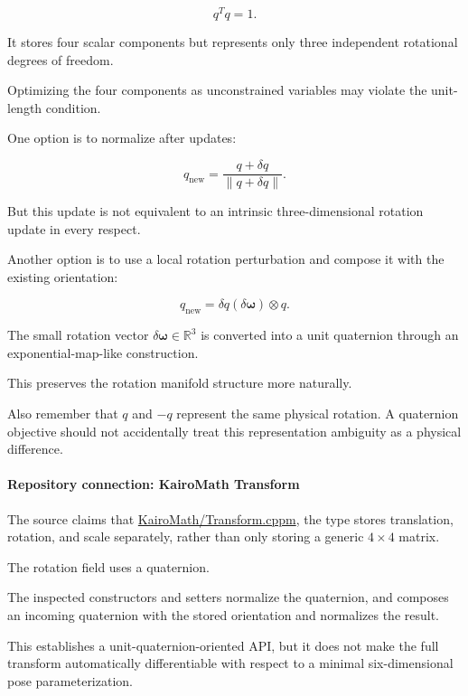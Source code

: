\[
q^Tq=1.
\]

It stores four scalar components but represents only three independent rotational degrees of freedom.

Optimizing the four components as unconstrained variables may violate the unit-length condition.

One option is to normalize after updates:

\[
q_{\mathrm{new}}= \frac{q+\delta q}{\|q+\delta q\|}.
\]

But this update is not equivalent to an intrinsic three-dimensional rotation update in every respect.

Another option is to use a local rotation perturbation and compose it with the existing orientation:

\[
q_{\mathrm{new}}= \delta q(\delta\boldsymbol\omega)\otimes q.
\]

The small rotation vector \(\delta\boldsymbol\omega\in\mathbb R^3\) is converted into a unit quaternion through an exponential-map-like construction.

This preserves the rotation manifold structure more naturally.

Also remember that \(q\) and \(-q\) represent the same physical rotation. A quaternion objective should not accidentally treat this representation ambiguity as a physical difference.

\paragraph{Repository connection: KairoMath Transform}\label{02-foundations-ii-ch027-repository-connection-kairomath-transform}

\hypertarget{02-foundations-ii-ch027-repository-connection-kairomath-transform}{}

The source claims that \href{https://github.com/swayam8624/KairoMath/blob/master/Transform.cppm?utm_source=chatgpt.com}{KairoMath/Transform.cppm}, the  type stores translation, rotation, and scale separately, rather than only storing a generic \(4\times4\) matrix.

The rotation field uses a quaternion.

The inspected constructors and setters normalize the quaternion, and  composes an incoming quaternion with the stored orientation and normalizes the result.

This establishes a unit-quaternion-oriented API, but it does not make the full transform automatically differentiable with respect to a minimal six-dimensional pose parameterization.

